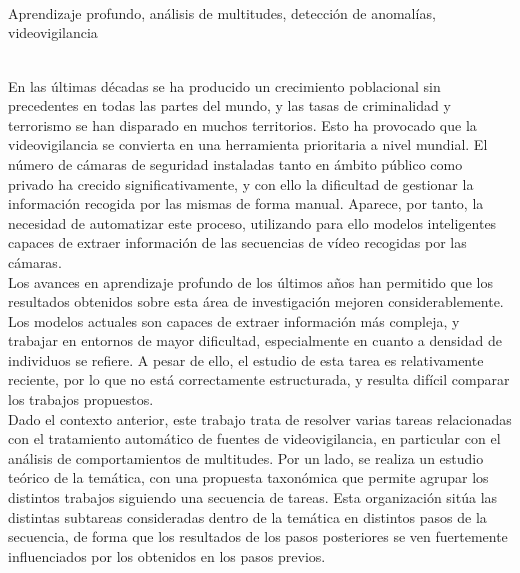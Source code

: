 \documentclass[../main.tex]{memoir}
\begin{document}
\thispagestyle{empty}

\begin{center}
  {\large\bfseries \ProjectTitle}\\
\end{center}

\begin{center}
  \AuthorName\\
  \vspace{0.7cm}
  \\
  Aprendizaje profundo, análisis de multitudes, detección de
  anomalías, videovigilancia\\
  \vspace{0.7cm}
  \\

\end{center}

En las últimas décadas se ha producido un crecimiento poblacional sin
precedentes en todas las partes del mundo, y las tasas de criminalidad
y terrorismo se han disparado en muchos territorios. Esto ha provocado
que la videovigilancia se convierta en una herramienta prioritaria a
nivel mundial. El número de cámaras de seguridad instaladas tanto en
ámbito público como privado ha crecido significativamente, y con ello
la dificultad de gestionar la información recogida por las mismas de
forma manual. Aparece, por tanto, la necesidad de automatizar este
proceso, utilizando para ello modelos inteligentes capaces de extraer
información de las secuencias de vídeo recogidas por las cámaras.\\

Los avances en aprendizaje profundo de los últimos años han permitido
que los resultados obtenidos sobre esta área de investigación mejoren
considerablemente. Los modelos actuales son capaces de extraer
información más compleja, y trabajar en entornos de mayor dificultad,
especialmente en cuanto a densidad de individuos se refiere. A pesar
de ello, el estudio de esta tarea es relativamente reciente, por lo
que no está correctamente estructurada, y resulta difícil comparar los
trabajos propuestos.\\

Dado el contexto anterior, este trabajo trata de resolver varias
tareas relacionadas con el tratamiento automático de fuentes de
videovigilancia, en particular con el análisis de comportamientos de
multitudes. Por un lado, se realiza un estudio teórico de la temática,
con una propuesta taxonómica que permite agrupar los distintos
trabajos siguiendo una secuencia de tareas. Esta organización sitúa
las distintas subtareas consideradas dentro de la temática en
distintos pasos de la secuencia, de forma que los resultados de los
pasos posteriores se ven fuertemente influenciados por los obtenidos
en los pasos previos.\\
\end{document}
